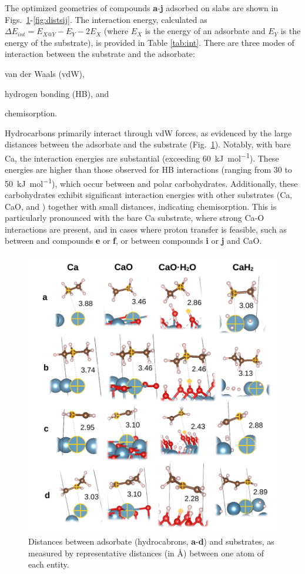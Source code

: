 \documentclass[12pt,a4paper]{article}
\begin{document}
The optimized geometries of compounds \textbf{a}-\textbf{j} adsorbed on slabs are shown in Figs.~\ref{fig:distsad}-\ref{fig:distsij}. The interaction energy, calculated as $\Delta E_{int} = E_{X@Y} - E_Y - 2E_X$ (where $E_X$ is the energy of an adsorbate and $E_Y$ is the energy of the substrate), is provided in Table \ref{tab:int}. There are three modes of interaction between the substrate and the adsorbate: \begin{inparaenum}[i)]
	\item van der Waals (vdW),
	\item hydrogen bonding (HB), and
	\item chemisorption.
\end{inparaenum}
Hydrocarbons primarily interact through vdW forces, as evidenced by the large distances between the adsorbate and the substrate (Fig.~\ref{fig:distsad}). Notably, with bare Ca, the interaction energies are substantial (exceeding \SI{60}{\kilo\joule\per\mole}). These energies are higher than those observed for HB interactions (ranging from 30 to \SI{50}{\kilo\joule\per\mole}), which occur between  and polar carbohydrates. Additionally, these carbohydrates exhibit significant interaction energies with other substrates (Ca, CaO, and ) together with small distances, indicating chemisorption. This is particularly pronounced with the bare Ca substrate, where strong Ca-O interactions are present, and in cases where proton transfer is feasible, such as between  and compounds \textbf{e} or \textbf{f}, or between compounds \textbf{i} or \textbf{j} and CaO.


\begin{figure}[!h]
	\centering
	\includegraphics[width=.7\linewidth]{Figure6}
	\caption{Distances between adsorbate (hydrocabrons, \textbf{a}-\textbf{d}) and substrates, as measured by representative distances (in \si{\angstrom}) between one atom of each entity.}
	\label{fig:distsad}
\end{figure}
\end{document}
